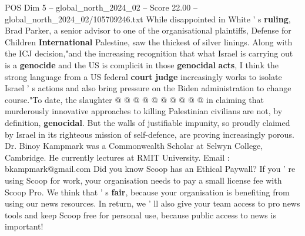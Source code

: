 \begin{textsample}{POS Dim 5 – global\_north\_2024\_02 – Score 22.00 – global\_north\_2024\_02/105709246.txt}
While disappointed in White ' s \textbf{ruling}, Brad Parker, a senior advisor to one of the organisational plaintiffs, Defense for Children \textbf{International} Palestine, saw the thickest of silver linings.
Along with the ICJ decision,"and the increasing recognition that what Israel is carrying out is a \textbf{genocide} and the US is complicit in those \textbf{genocidal} \textbf{acts}, I think the strong language from a US federal \textbf{court} \textbf{judge} increasingly works to isolate Israel ' s actions and also bring pressure on the Biden administration to change course."To date, the slaughter @ @ @ @ @ @ @ @ @ @ in claiming that murderously innovative approaches to killing Palestinian civilians are not, by definition, \textbf{genocidal}.
But the walls of justifiable impunity, so proudly claimed by Israel in its righteous mission of self-defence, are proving increasingly porous.
Dr.
Binoy Kampmark was a Commonwealth Scholar at Selwyn College, Cambridge.
He currently lectures at RMIT University.
Email : bkampmark@gmail.com Did you know Scoop has an Ethical Paywall?
If you ' re using Scoop for work, your organisation needs to pay a small license fee with Scoop Pro.
We think that ' s \textbf{fair}, because your organisation is benefiting from using our news resources.
In return, we ' ll also give your team access to pro news tools and keep Scoop free for personal use, because public access to news is important!

\end{textsample}
